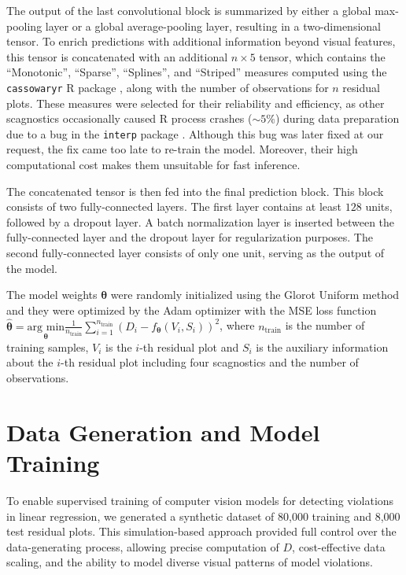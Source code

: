 \documentclass[]{interact}
\theoremstyle{plain}%
\theoremstyle{definition}
\theoremstyle{remark}
\begin{document}
The output of the last convolutional block is summarized by either a
global max-pooling layer or a global average-pooling layer, resulting in
a two-dimensional tensor. To enrich predictions with additional
information beyond visual features, this tensor is concatenated with an
additional \(n \times 5\) tensor, which contains the ``Monotonic'',
``Sparse'', ``Splines'', and ``Striped'' measures computed using the
\texttt{cassowaryr} R package \citep{mason2022cassowaryr} , along with
the number of observations for \(n\) residual plots. These measures were
selected for their reliability and efficiency, as other scagnostics
occasionally caused R process crashes (\(\sim 5\%\)) during data
preparation due to a bug in the \texttt{interp} package
\citep{Albrecht2023interp}. Although this bug was later fixed at our
request, the fix came too late to re-train the model. Moreover, their
high computational cost makes them unsuitable for fast inference.

The concatenated tensor is then fed into the final prediction block.
This block consists of two fully-connected layers. The first layer
contains at least \(128\) units, followed by a dropout layer. A batch
normalization layer is inserted between the fully-connected layer and
the dropout layer for regularization purposes. The second
fully-connected layer consists of only one unit, serving as the output
of the model.

The model weights \(\boldsymbol{\theta}\) were randomly initialized
using the Glorot Uniform method \citep{glorot2010understanding} and they
were optimized by the Adam optimizer \citep{kingma2014adam} with the MSE
loss function
\(\hat{\boldsymbol{\theta}} = \underset{\boldsymbol{\theta}}{\text{arg min}}\frac{1}{n_{\text{train}}}\sum_{i=1}^{n_{\text{train}}}(D_i - f_{\boldsymbol{\theta}}(V_i, S_i))^2\),
where \(n_{\text{train}}\) is the number of training samples, \(V_i\) is
the \(i\)-th residual plot and \(S_i\) is the auxiliary information
about the \(i\)-th residual plot including four scagnostics and the
number of observations.

\section{Data Generation and Model
Training}\label{sec-model-data-generation}

To enable supervised training of computer vision models for detecting
violations in linear regression, we generated a synthetic dataset of
80,000 training and 8,000 test residual plots. This simulation-based
approach provided full control over the data-generating process,
allowing precise computation of \(D\), cost-effective data scaling, and
the ability to model diverse visual patterns of model violations.
\end{document}
